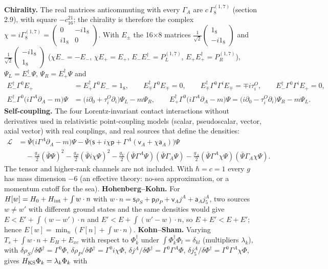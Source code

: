 \documentclass[10pt,a4paper]{article}
\begin{document}
\textbf{Chirality.} The real matrices anticommuting with every $\Gamma_A$ are $c\,\Gamma^{(1,7)}_8$ (section 2.9), with square $-c^21_{16}$; the chirality is therefore the complex $\chi=i\Gamma^{(1,7)}_8=\left(\begin{smallmatrix}0&-i1_8\\i1_8&0\end{smallmatrix}\right)$. With $E_\pm$ the 16×8 matrices $\frac1{\sqrt2}\left(\begin{smallmatrix}1_8\\-i1_8\end{smallmatrix}\right)$ and $\frac1{\sqrt2}\left(\begin{smallmatrix}-i1_8\\1_8\end{smallmatrix}\right)$ ($\chi E_-=-E_-$, $\chi E_+=E_+$, $E_-E_-^\dagger=P^{(1,7)}_L$, $E_+E_+^\dagger=P^{(1,7)}_R$), $\Psi_L=E_-^\dagger\Psi$, $\Psi_R=E_+^\dagger\Psi$ and
\begin{align*}
E_-^\dagger\Gamma^0E_+&=E_+^\dagger\Gamma^0E_-=1_8,\qquad E_\mp^\dagger\Gamma^0E_\mp=0,\qquad E_\mp^\dagger\Gamma^0\Gamma^iE_\mp=\mp i\tau^{O}_i,\qquad E_-^\dagger\Gamma^0\Gamma^iE_+=0, \\
E_-^\dagger\Gamma^0\big(i\Gamma^{A}\partial_A-m\big)\Psi&=\big(i\partial_0+\tau^{O}_i\partial_i\big)\Psi_L-m\Psi_R,\qquad E_+^\dagger\Gamma^0\big(i\Gamma^{A}\partial_A-m\big)\Psi=\big(i\partial_0-\tau^{O}_i\partial_i\big)\Psi_R-m\Psi_L .
\end{align*}
\textbf{Self-coupling.} The four Lorentz-invariant contact interactions without derivatives used in relativistic point-coupling models (scalar, pseudoscalar, vector, axial vector) with real couplings, and real sources that define the densities:
\begin{align*}
\mathcal L&=\bar\Psi\big(i\Gamma^{A}\partial_A-m\big)\Psi-\bar\Psi\big(\mathsf s+i\chi\mathsf p+\Gamma^{A}(\mathsf v_A+\chi\mathsf a_A)\big)\Psi \\
&\quad-\frac{g_S}2(\bar\Psi\Psi)^2-\frac{g_P}2(\bar\Psi i\chi\Psi)^2-\frac{g_V}2(\bar\Psi\Gamma^{A}\Psi)(\bar\Psi\Gamma_A\Psi)-\frac{g_A}2(\bar\Psi\Gamma^{A}\chi\Psi)(\bar\Psi\Gamma_A\chi\Psi).
\end{align*}
The tensor and higher-rank channels are not included. With $\hbar=c=1$ every $g$ has mass dimension $-6$ (an effective theory: no-sea approximation, or a momentum cutoff for the sea). \textbf{Hohenberg–Kohn.} For $H[w]=H_0+H_{\rm int}+\int w\cdot n$ with $w\cdot n=\mathsf s\rho_S+\mathsf p\rho_P+\mathsf v_Aj^A+\mathsf a_Aj_5^A$, two sources $w\neq w'$ with different ground states and the same densities would give $E<E'+\int(w-w')\cdot n$ and $E'<E+\int(w'-w)\cdot n$, so $E+E'<E+E'$; hence $E[w]=\min_n(F[n]+\int w\cdot n)$. \textbf{Kohn–Sham.} Varying $T_s+\int w\cdot n+E_H+E_{xc}$ with respect to $\Phi_k^\dagger$ under $\int\Phi_k^\dagger\Phi_l=\delta_{kl}$ (multipliers $\lambda_k$), with $\delta\rho_S/\delta\Phi^\dagger=\Gamma^0\Phi$, $\delta\rho_P/\delta\Phi^\dagger=\Gamma^0i\chi\Phi$, $\delta j^A/\delta\Phi^\dagger=\Gamma^0\Gamma^A\Phi$, $\delta j_5^A/\delta\Phi^\dagger=\Gamma^0\Gamma^A\chi\Phi$, gives $H_{\rm KS}\Phi_k=\lambda_k\Phi_k$ with
\end{document}
